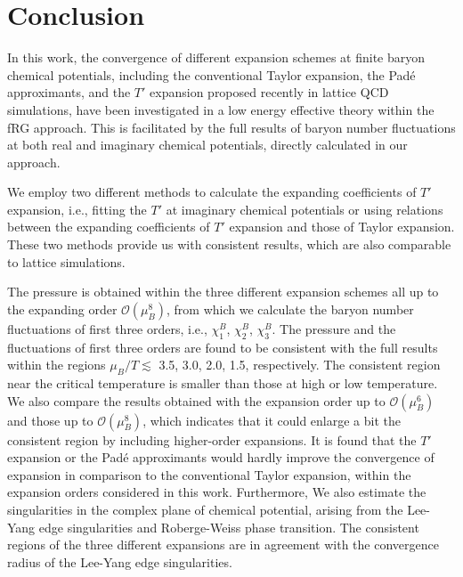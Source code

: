 \documentclass[%
reprint,
superscriptaddress,
preprintnumbers,
amsmath,amssymb,
aps,
prd,
]{revtex4-2}
\begin{document}

\section{Conclusion}
\label{sec:sum}

In this work, the convergence of different expansion schemes at finite baryon chemical potentials, including the conventional Taylor expansion, the Pad\'e approximants, and the $T'$ expansion proposed recently in lattice QCD simulations, have been investigated in a low energy effective theory within the fRG approach. This is facilitated by the full results of baryon number fluctuations at both real and imaginary chemical potentials, directly calculated in our approach. 

We employ two different methods to calculate the expanding coefficients of $T'$ expansion, i.e., fitting the $T'$ at imaginary chemical potentials or using relations between the expanding coefficients of $T'$ expansion and those of Taylor expansion. These two methods provide us with consistent results, which are also comparable to lattice simulations.

The pressure is obtained within the three different expansion schemes all up to the expanding order $\mathcal{O}(\mu_B^8)$, from which we calculate the baryon number fluctuations of first three orders, i.e., $\chi_1^B$, $\chi_2^B$, $\chi_3^B$. The pressure and the fluctuations of first three orders are found to be consistent with the full results within the regions $\mu_B/T \lesssim$ 3.5, 3.0, 2.0, 1.5, respectively. The consistent region near the critical temperature is smaller than those at high or low temperature. We also compare the results obtained with the expansion order up to $\mathcal{O}(\mu_B^6)$ and those up to $\mathcal{O}(\mu_B^8)$, which indicates that it could enlarge a bit the consistent region by including higher-order expansions. It is found that the $T'$ expansion or the Pad\'e approximants would hardly improve the convergence of expansion in comparison to the conventional Taylor expansion, within the expansion orders considered in this work. Furthermore, We also estimate the singularities in the complex plane of chemical potential, arising from the Lee-Yang edge singularities and Roberge-Weiss phase transition. The consistent regions of the three different expansions are in agreement with the convergence radius of the Lee-Yang edge singularities.
\end{document}
